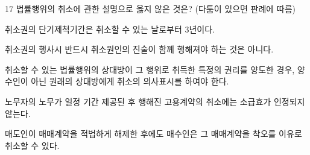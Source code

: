 \begin{question}{17}
법률행위의 취소에 관한 설명으로 옳지 않은 것은? (다툼이 있으면 판례에 따름)
\begin{choices}
  \item 취소권의 단기제척기간은 취소할 수 있는 날로부터 3년이다.
  \item 취소권의 행사시 반드시 취소원인의 진술이 함께 행해져야 하는 것은 아니다.
  \item 취소할 수 있는 법률행위의 상대방이 그 행위로 취득한 특정의 권리를 양도한 경우, 양수인이 아닌 원래의 상대방에게 취소의 의사표시를 하여야 한다.
  \item 노무자의 노무가 일정 기간 제공된 후 행해진 고용계약의 취소에는 소급효가 인정되지 않는다.
  \item 매도인이 매매계약을 적법하게 해제한 후에도 매수인은 그 매매계약을 착오를 이유로 취소할 수 있다.
\end{choices}
\end{question}
